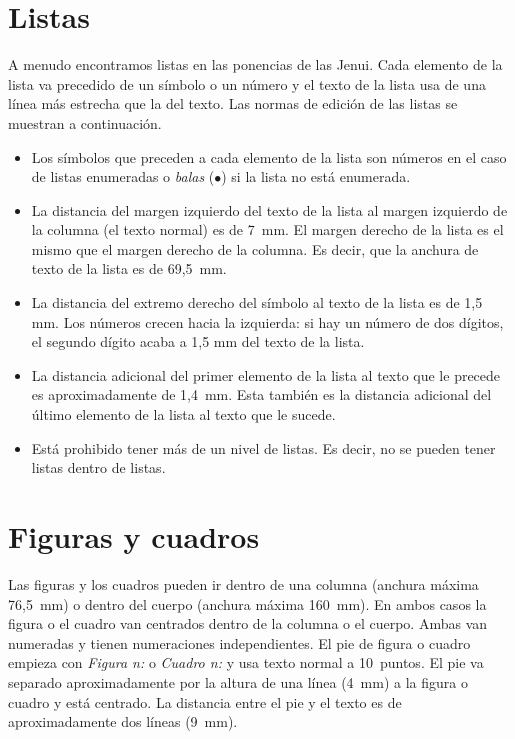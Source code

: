 \documentclass[twocolumn,twoside,a4paper, 10pt]{article}
\begin{document}
\section{Listas}

A menudo encontramos listas en las ponencias de las Jenui. 
Cada elemento de la lista va precedido de un símbolo o un número y 
el texto de la lista usa de una línea más estrecha que la del texto. 
Las normas de edición de las listas se muestran a continuación.

\begin{itemize}
	\item Los símbolos que preceden a cada elemento de la lista son 
	números en el caso de listas enumeradas o \emph{balas} 
	($\bullet$) si la lista no está enumerada.
	
	\item La distancia del margen izquierdo del texto de la lista al
	margen izquierdo de la columna (el texto normal) es de 7~mm.  El
	margen derecho de la lista es el mismo que el margen derecho de la
	columna. Es decir, que la anchura de texto de la lista es de 69,5~mm.
	
	\item La distancia del extremo derecho del símbolo al texto de la 
	lista es de 1,5 mm. Los números crecen hacia la izquierda: si hay 
	un número de dos dígitos, el segundo dígito acaba a 1,5 mm del 
	texto de la lista.
	
	\item La distancia adicional del primer elemento de la lista al texto que 
	le precede es aproximadamente de 1,4~mm. Esta también es la distancia adicional del último 
	elemento de la lista al texto que le sucede.
	
	\item Está prohibido tener más de un nivel de 
	listas. Es decir, no se pueden tener listas dentro de listas.
\end{itemize}

\section{Figuras y cuadros}

Las figuras y los cuadros pueden ir dentro de una columna (anchura 
máxima 76,5~mm) o dentro del cuerpo (anchura máxima 160~mm). En ambos 
casos la figura o el cuadro van centrados dentro de la columna o el 
cuerpo. Ambas van numeradas y tienen numeraciones independientes. El 
pie de figura o cuadro empieza con \emph{Figura n:} o \emph{Cuadro 
n:} y usa texto normal a 10~puntos. El pie  va separado 
aproximadamente por la altura de una línea (4~mm) a la figura o 
cuadro y está centrado. La distancia entre el pie y el texto es de 
aproximadamente dos líneas (9~mm).
\end{document}
